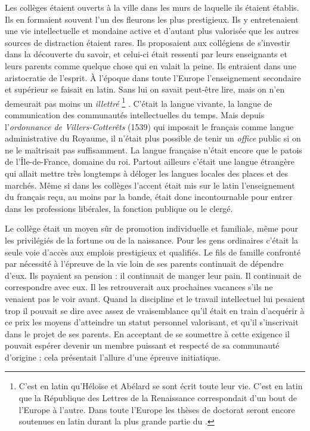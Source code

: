 Les collèges étaient ouverts à la ville dans les murs de laquelle ils étaient établis. Ils en formaient souvent l'un des fleurons les plus prestigieux. Ils y entretenaient une vie intellectuelle et mondaine active et d'autant plus valorisée que les autres sources de distraction étaient rares. Ils proposaient aux collégiens de s'investir dans la découverte du savoir, et celui-ci était ressenti par leurs enseignants et leurs parents comme quelque chose qui en valait la peine. Ils entraient dans une aristocratie de l'esprit. À l'époque dans toute l'Europe l'enseignement secondaire et supérieur se faisait en latin. Sans lui on savait peut-être lire, mais on n'en demeurait pas moins un \emph{illettré}%
\footnote{C'est en latin qu'Héloïse et Abélard se sont écrit toute leur vie. C'est en latin que la République des Lettres de la Renaissance correspondait d'un bout de l'Europe à l'autre. Dans toute l'Europe les thèses de doctorat seront encore soutenues en latin durant la plus grande partie du .}%
. C'était la langue vivante, la langue de communication des communautés intellectuelles du temps. Mais depuis l'\emph{ordonnance de Villers-Cotterêts} (1539) qui imposait le français comme langue administrative du Royaume, il n'était plus possible de tenir un \emph{office} public si on ne le maîtrisait pas suffisamment. La langue française n'était encore que le patois de l'Île-de-France, domaine du roi. Partout ailleurs c'était une langue étrangère qui allait mettre très longtemps à déloger les langues locales des places et des marchés. Même si dans les collèges l'accent était mis sur le latin l'enseignement du français reçu, au moins par la bande, était donc incontournable pour entrer dans les professions libérales, la fonction publique ou le clergé. 


 Le collège était un moyen sûr de promotion individuelle et familiale, même pour les privilégiés de la fortune ou de la naissance. Pour les gens ordinaires c'était la seule voie d'accès aux emplois prestigieux et qualifiés. Le fils de famille confronté par nécessité à l'épreuve de la vie loin de ses parents continuait de dépendre d'eux. Ils payaient sa pension : il continuait de manger leur pain. Il continuait de correspondre avec eux. Il les retrouverait aux prochaines vacances s'ils ne venaient pas le voir avant. Quand la discipline et le travail intellectuel lui pesaient trop il pouvait se dire avec assez de vraisemblance qu'il était en train d'acquérir à ce prix les moyens d'atteindre un statut personnel valorisant, et qu'il s'inscrivait dans le projet de ses parents. En acceptant de se soumettre à cette exigence il pouvait espérer devenir un membre puissant et respecté de sa communauté d'origine : cela présentait l'allure d'une épreuve initiatique.
 
